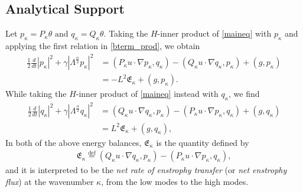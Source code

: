 \documentclass[twoside, reqno]{amsart}
\numberwithin{lemma}{section}
\numberwithin{theorem}{section}
\numberwithin{proposition}{section}
\numberwithin{equation}{section} %
\newcommand{\te}{\theta}
\newcommand{\ga}{\gamma}
\newcommand{\la}{\Lambda}
\begin{document}
\subsection{Analytical Support}
Let $p_{\kappa}= P_{\kappa}\te \text{  and  } q_{\kappa}= Q_{\kappa}\te$.
{Taking the $H$-inner product of  \eqref{maineq} with} $p_{\kappa}$ %
and applying the first relation in \eqref{bterm_prod},
we obtain
\begin{equation} \label{prod_E_k}
\begin{split} 
        \frac{1}{2} \frac{d}{dt} |p_{\kappa}|^2 + \ga |\la^{\frac{\alpha}{2}} p_{\kappa}|^2 & = (P_{\kappa}u\cdotp\nabla p_{\kappa},q_{\kappa}) - (Q_{\kappa}u\cdotp\nabla q_{\kappa},p_{\kappa}) + (g,p_{\kappa}) \\
        & = - L^2\mathfrak{E}_{\kappa} + (g,p_{\kappa}) .
\end{split}    
\end{equation}
{While taking the $H$-inner product of \eqref{maineq} instead with} $q_{\kappa}$, we find
\begin{equation} \label{prod_e_k}
\begin{split}
        \frac{1}{2} \frac{d}{dt} |q_{\kappa}|^2 + \ga |\la^{\frac{\alpha}{2}} q_{\kappa}|^2 & = (Q_{\kappa}u\cdotp\nabla q_{\kappa},p_{\kappa}) - (P_{\kappa}u\cdotp\nabla p_{\kappa},q_{\kappa}) + (g,q_{\kappa}) \\
        & = L^2\mathfrak{E}_{\kappa} + (g,q_{\kappa}) ,
\end{split}    
\end{equation}
{In both of the above energy balances,  $\mathfrak{E}_{\kappa}$ is the quantity defined by
    \begin{align}\label{def:enstrophy:flux}
        \mathfrak{E}_{\kappa}\overset{\text{def}}{=}(Q_{\kappa}u \cdotp\nabla q_{\kappa},p_{\kappa}) - (P_{\kappa}u \cdotp\nabla p_{\kappa},q_{\kappa}),
    \end{align}
and it is interpreted to be the} \textit{net rate of enstrophy transfer} (or \textit{net enstrophy flux}) at the wavenumber $\kappa$, from the low modes to the high modes.
\end{document}
